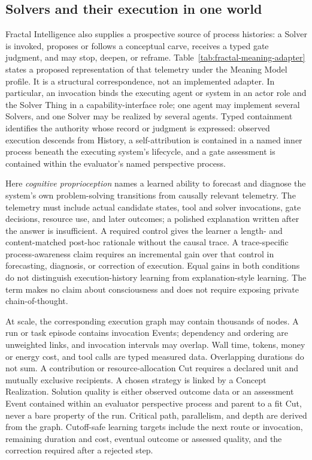 \documentclass[10pt]{article}
\begin{document}
\subsection{Solvers and their execution in one world}
\label{sec:solvers}

Fractal Intelligence also supplies a prospective source of process
histories: a Solver is invoked, proposes or follows a conceptual carve, receives
a typed gate judgment, and may stop, deepen, or reframe.
Table~\ref{tab:fractal-meaning-adapter} states a
proposed representation of that telemetry under the Meaning Model profile. It
is a structural correspondence, not an implemented adapter. In particular, an
invocation binds the executing agent or system in an actor role and the Solver
Thing in a capability-interface role; one agent may implement several Solvers,
and one Solver may be realized by several agents. Typed containment identifies
the authority whose record or judgment is expressed: observed execution
descends from History, a self-attribution is contained in a named inner process
beneath the executing system's lifecycle, and a gate assessment is contained
within the evaluator's named perspective process.

Here \emph{cognitive proprioception} names a learned ability to forecast and
diagnose the system's own problem-solving transitions from causally relevant
telemetry. The telemetry must include actual candidate states, tool and solver
invocations, gate decisions, resource use, and later outcomes; a polished
explanation written after the answer is insufficient. A required control gives
the learner a length- and content-matched post-hoc rationale without the causal
trace. A trace-specific process-awareness claim requires an incremental gain
over that control in forecasting, diagnosis, or correction of execution.
Equal gains in both conditions do not distinguish execution-history learning
from explanation-style learning. The term makes no claim about consciousness
and does not require exposing private chain-of-thought.

At scale, the corresponding execution graph may contain thousands of nodes. A
run or task episode contains invocation Events; dependency and ordering are
unweighted links, and invocation intervals may overlap. Wall time, tokens,
money or energy cost, and tool calls are typed measured data. Overlapping
durations do not sum. A contribution or resource-allocation Cut requires a
declared unit and mutually exclusive recipients. A chosen
strategy is linked by a Concept Realization. Solution quality is either observed
outcome data or an assessment Event contained within an evaluator perspective
process and parent to a fit Cut, never a bare
property of the run. Critical path, parallelism, and depth are derived from the
graph. Cutoff-safe learning targets include the next route or invocation,
remaining duration and cost, eventual outcome or assessed quality, and the
correction required after a rejected step.
\end{document}
